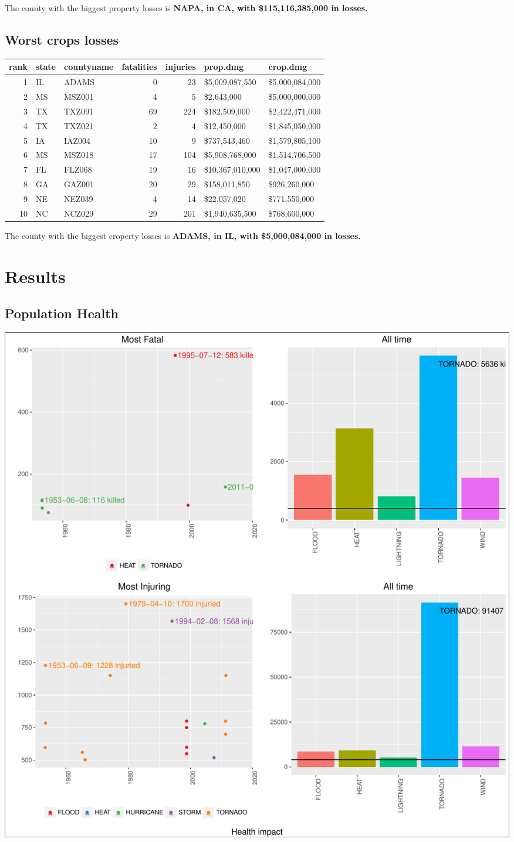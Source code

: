 \documentclass[]{article}
\begin{document}
The county with the biggest property losses is \textbf{NAPA, in CA, with
\$115,116,385,000 in losses.}

\subsection{Worst crops losses}\label{worst-crops-losses}

\begin{longtable}[]{@{}rllrrll@{}}
\toprule
rank & state & countyname & fatalities & injuries & prop.dmg &
crop.dmg\tabularnewline
\midrule
\endhead
1 & IL & ADAMS & 0 & 23 & \$5,009,087,550 &
\$5,000,084,000\tabularnewline
2 & MS & MSZ001 & 4 & 5 & \$2,643,000 & \$5,000,000,000\tabularnewline
3 & TX & TXZ091 & 69 & 224 & \$182,509,000 &
\$2,422,471,000\tabularnewline
4 & TX & TXZ021 & 2 & 4 & \$12,450,000 & \$1,845,050,000\tabularnewline
5 & IA & IAZ004 & 10 & 9 & \$737,543,460 &
\$1,579,805,100\tabularnewline
6 & MS & MSZ018 & 17 & 104 & \$5,908,768,000 &
\$1,514,706,500\tabularnewline
7 & FL & FLZ068 & 19 & 16 & \$10,367,010,000 &
\$1,047,000,000\tabularnewline
8 & GA & GAZ001 & 20 & 29 & \$158,011,850 & \$926,260,000\tabularnewline
9 & NE & NEZ039 & 4 & 14 & \$22,057,020 & \$771,550,000\tabularnewline
10 & NC & NCZ029 & 29 & 201 & \$1,940,635,500 &
\$768,600,000\tabularnewline
\bottomrule
\end{longtable}

The county with the biggest croperty losses is \textbf{ADAMS, in IL,
with \$5,000,084,000 in losses.}

\section{Results}\label{results}

\subsection{Population Health}\label{population-health}

\includegraphics{readme_files/figure-latex/health-plot-1.pdf}
\end{document}
